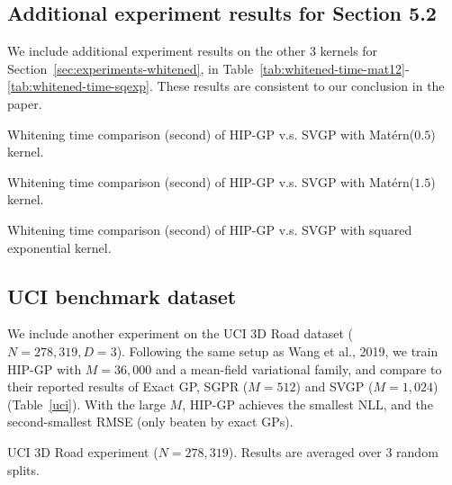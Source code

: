 \subsection{Additional experiment results for Section 5.2}
We include additional experiment results on the other 3 kernels for Section~\ref{sec:experiments-whitened}, in Table~\ref{tab:whitened-time-mat12}- \ref{tab:whitened-time-sqexp}. 
These results are consistent to our conclusion in the paper.
\begin{table}[!h]%
  \centering
  \scalebox{.8}{}
  \caption{Whitening time comparison (second) of HIP-GP v.s. SVGP with Matérn($0.5$) kernel.}
  \label{tab:whitened-time-mat12}
\end{table}

\begin{table}[!h]%
  \centering
  \scalebox{.8}{}
  \caption{Whitening time comparison (second) of HIP-GP v.s. SVGP with Matérn($1.5$) kernel.}
  \label{tab:whitened-time-mat32}
\end{table}

\begin{table}[!h]%
  \centering
  \scalebox{.8}{}
  \caption{Whitening time comparison (second) of HIP-GP v.s. SVGP with squared exponential kernel.}
  \label{tab:whitened-time-sqexp}
\end{table}

\vspace{5cm}





\subsection{UCI benchmark dataset}

We include another experiment on the UCI 3D Road dataset ($N= 278,319, D=3$).  Following the same setup as Wang et al., 2019, we train HIP-GP with $M= 36{,}000$ and a mean-field variational family, and compare to their reported results of Exact GP, SGPR ($M= 512$) and SVGP ($M= 1,024$) (Table~\ref{uci}). With the large $M$, HIP-GP achieves the smallest NLL, and the second-smallest RMSE (only beaten by exact GPs).

\begin{table}[!ht]
\centering
\scalebox{.8}{}
\caption{UCI 3D Road experiment ($N=278{,}319$). Results are averaged over 3 random splits.}
\label{uci}
\end{table}

